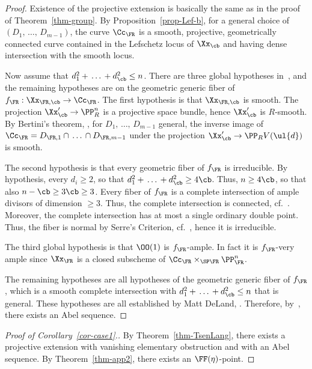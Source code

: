 \begin{proof}
Existence of the projective extension is basically the same as in the proof of Theorem~\ref{thm-group}. By Proposition~\ref{prop-Lef-b}, for a general choice of $(D_1,\,\dots,\,D_{m-1})$, the curve $\Cc_\FR$ is a smooth, projective, geometrically connected curve contained in the Lefschetz locus of $\Xx_\cb$ and having dense intersection with the smooth locus.

Now assume that $d_1^2 +\,\dots\,+ d_\cb^2\leq n$. There are three global hypotheses in~\cite[Theorem~13.1]{dJHS}, and the remaining hypotheses are on the geometric generic fiber of $f_\FR:\Xx_{\FR,\cb} \to \Cc_\FR$. The first hypothesis is that $\Xx_{\FR,\cb}$ is smooth. The projection $\Xx'_{\cb} \to \PP^n_R$ is a projective space bundle, hence $\Xx'_\cb$ is $R$-smooth. By Bertini's theorem, \cite[Théorème~6.3$\MK$(2)]{Jou}, for $D_1,\,\dots,\,D_{m-1}$ general, the inverse image of\linebreak$\Cc_\FR = D_{\FR,1}\cap\,\dots\,\cap D_{\FR,m-1}$ under the projection $\Xx'_\cb \to \PP_R V(\ul{d})$ is smooth.

The second hypothesis is that every geometric fiber of $f_\FR$ is irreducible. By hypothesis, every $d_i\geq 2$, so that $d_1^2 +\,\dots\,+ d_\cb^2
\geq 4\cb$. Thus, $n\geq 4\cb$, so that also $n-\cb \geq 3\cb \geq 3$. Every fiber of $f_\FR$ is a complete intersection of ample divisors of dimension $\geq 3$. Thus, the complete intersection is connected, cf.~\cite[Corollary~XII.3.5]{SGA1}. Moreover, the complete intersection has at most a single ordinary double point. Thus, the fiber is normal by Serre's Criterion, cf.~\cite[XI.3.11]{SGA1}, hence it is irreducible.

The third global hypothesis is that $\OO(1)$ is $f_\FR$-ample. In fact it is $f_\FR$-very ample since $\Xx_\FR$ is a closed subscheme of $\Cc_\FR \times_{\SP \FR} \PP^n_\FR$.

The remaining hypotheses are all hypotheses of the geometric generic fiber of $f_\FR$, which is a smooth complete intersection with $d_1^2 +\,
\dots\,+ d_\cb^2 \leq n$ that is general. These hypotheses are all established by Matt DeLand, \cite{DeLand}. Therefore, by~\cite[Theorem~13.1]{dJHS}, there exists an Abel sequence.
\end{proof}

\begin{proof}[Proof of Corollary~\ref{cor-case1}.]
By Theorem~\ref{thm-TsenLang}, there exists a projective extension with vanishing elementary obstruction and with an Abel sequence. By Theorem~\ref{thm-app2}, there exists an $\FF(\eta)$-point.
\end{proof}



